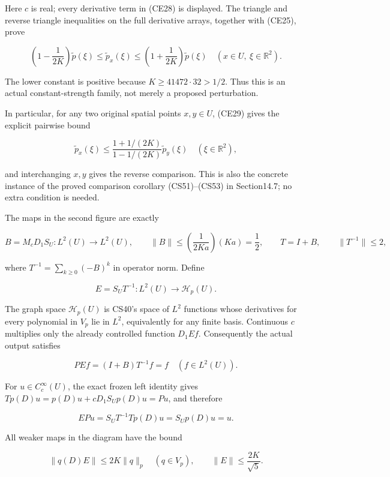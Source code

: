 \documentclass[
  11pt,
]{article}
\begin{document}
Here \(c\) is real; every derivative term in (CE28) is displayed. The
triangle and reverse triangle inequalities on the full derivative
arrays, together with (CE25), prove

\[
 \left(1-\frac1{2K}\right)\widetilde p(\xi)
 \leq\widetilde p_x(\xi)
 \leq\left(1+\frac1{2K}\right)\widetilde p(\xi)
                 \quad(x\in U,\ \xi\in\mathbb R^2).          \tag{CE29}
\]

The lower constant is positive because \(K\geq41472\cdot32>1/2\). Thus
this is an actual constant-strength family, not merely a proposed
perturbation.

In particular, for any two original spatial points \(x,y\in U\), (CE29)
gives the explicit pairwise bound

\[
 \widetilde p_x(\xi)
 \leq\frac{1+1/(2K)}{1-1/(2K)}\widetilde p_y(\xi)
                  \quad(\xi\in\mathbb R^2),                  \tag{CE29a}
\]

and interchanging \(x,y\) gives the reverse comparison. This is also the
concrete instance of the proved comparison corollary (CS51)--(CS53) in
Section14.7; no extra condition is needed.

The maps in the second figure are exactly

\[
 B=M_cD_1S_U:L^2(U)\to L^2(U),\qquad
 \|B\|\leq\left(\frac1{2Ka}\right)(Ka)=\frac12,
 \qquad T=I+B,\qquad \|T^{-1}\|\leq2,                       \tag{CE30}
\]

where \(T^{-1}=\sum_{k\geq0}(-B)^k\) in operator norm. Define

\[
 E=S_UT^{-1}:L^2(U)\to\mathcal H_p(U).                         \tag{CE31}
\]

The graph space \(\mathcal H_p(U)\) is CS40's space of \(L^2\) functions
whose derivatives for every polynomial in \(V_p\) lie in \(L^2\),
equivalently for any finite basis. Continuous \(c\) multiplies only the
already controlled function \(D_1Ef\). Consequently the actual output
satisfies

\[
 PEf=(I+B)T^{-1}f=f\quad(f\in L^2(U)).                        \tag{CE32}
\]

For \(u\in C_c^\infty(U)\), the exact frozen left identity gives
\(T p(D)u=p(D)u+cD_1S_Up(D)u=Pu\), and therefore

\[
 EPu=S_UT^{-1}T p(D)u=S_Up(D)u=u.                            \tag{CE33}
\]

All weaker maps in the diagram have the bound

\[
 \|q(D)E\|\leq2K\|q\|_p\quad(q\in V_p),\qquad
 \|E\|\leq\frac{2K}{\sqrt5}.                                \tag{CE34}
\]
\end{document}
